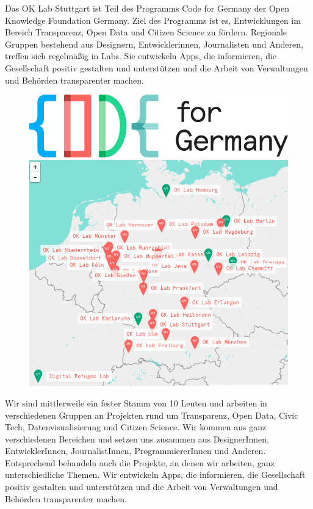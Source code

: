 \documentclass[
notumble,
]{leaflet}
\begin{document}
Das OK Lab Stuttgart ist Teil des Programms Code for Germany der Open Knowledge Foundation Germany. Ziel des Programms ist es, Entwicklungen im Bereich Transparenz, Open Data und Citizen Science zu fördern. Regionale Gruppen bestehend aus Designern, Entwicklerinnen, Journalisten und Anderen, treffen sich regelmäßig in Labs. Sie entwickeln Apps, die informieren, die Gesellschaft positiv gestalten und unterstützen und die Arbeit von Verwaltungen und Behörden transparenter machen.

\begin{figure}
\noindent\includegraphics[width=\textwidth]{images/CFG_logo}\\
\noindent\includegraphics[width=\textwidth]{images/codefordemap}
\end{figure}

Wir sind mittlerweile ein fester Stamm von 10 Leuten und arbeiten in verschiedenen Gruppen an Projekten rund um Transparenz, Open Data, Civic Tech, Datenvisualisierung und Citizen Science. Wir kommen aus ganz verschiedenen Bereichen und setzen uns zusammen aus DesignerInnen, EntwicklerInnen, JournalistInnen, ProgrammiererInnen und Anderen. Entsprechend behandeln auch die Projekte, an denen wir arbeiten, ganz unterschiedliche Themen. Wir entwickeln Apps, die informieren, die Gesellschaft positiv gestalten und unterstützen und die Arbeit von Verwaltungen und Behörden transparenter machen.
\end{document}
